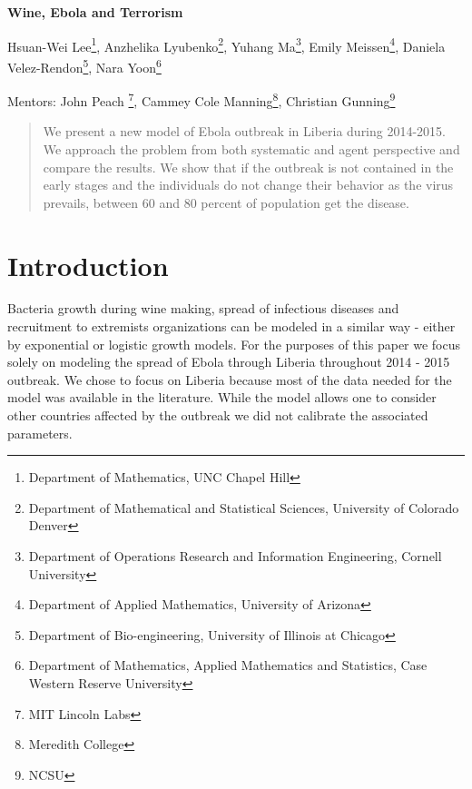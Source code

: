 \documentclass[10pt]{article}
\begin{document}
 

\centerline{\large \bf Wine, Ebola and Terrorism}

\vspace{.1truein}

\def\thefootnote{\arabic{footnote}}
\begin{center}
  Hsuan-Wei Lee\footnote{Department of Mathematics, UNC Chapel Hill},
  Anzhelika Lyubenko\footnote{Department of Mathematical and Statistical Sciences, University of Colorado Denver},
  Yuhang Ma\footnote{Department of Operations Research and Information Engineering, Cornell University},
  Emily Meissen\footnote{Department of Applied Mathematics, University of Arizona},
  Daniela Velez-Rendon\footnote{Department of Bio-engineering, University of Illinois at Chicago},
    Nara Yoon\footnote{
Department of Mathematics, Applied Mathematics and Statistics, Case Western Reserve University}
\end{center}


\begin{center}
Mentors: John Peach \footnote{MIT Lincoln Labs}, Cammey Cole Manning\footnote{Meredith College},
Christian Gunning\footnote{NCSU}
\end{center}

\begin{abstract}
\noindent We present a new model of Ebola outbreak in Liberia during 2014-2015. We approach the problem from both systematic and agent perspective and compare the results. We show that if the outbreak is not contained in the early stages and the individuals do not change their behavior as the virus prevails, between 60 and 80 percent of population get the disease. 
\end{abstract}
%
%
\section{Introduction}
Bacteria growth during wine making, spread of infectious diseases and recruitment to extremists organizations can be modeled in a similar way - either by exponential or logistic growth models. For the purposes of this paper we focus solely on modeling the spread of Ebola through Liberia throughout 2014 - 2015 outbreak. We chose to focus on Liberia because most of the data needed for the model was available in the literature. While the model allows one to consider other countries affected by the outbreak we did not calibrate the associated parameters. 
\end{document}

